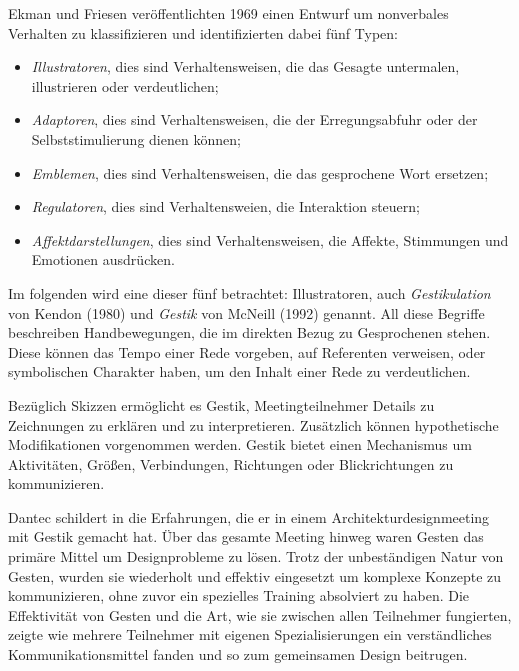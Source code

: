 Ekman und Friesen veröffentlichten 1969 einen Entwurf um nonverbales Verhalten zu klassifizieren und identifizierten dabei fünf Typen:
\begin{itemize}
	\item \emph{Illustratoren}, dies sind Verhaltensweisen, die das Gesagte untermalen, illustrieren oder verdeutlichen;
	\item \emph{Adaptoren}, dies sind Verhaltensweisen, die der Erregungsabfuhr oder der Selbststimulierung dienen können;
	\item \emph{Emblemen}, dies sind Verhaltensweisen, die das gesprochene Wort ersetzen;
	\item \emph{Regulatoren}, dies sind Verhaltensweien, die Interaktion steuern;
	\item \emph{Affektdarstellungen}, dies sind Verhaltensweisen, die Affekte, Stimmungen und Emotionen ausdrücken.
\end{itemize} \begin{flushright} \citep{Schaefer:2003} \end{flushright}

Im folgenden wird eine dieser fünf betrachtet: Illustratoren, auch \emph{Gestikulation} von Kendon (1980) und \emph{Gestik} von McNeill (1992) genannt. All diese Begriffe beschreiben Handbewegungen, die im direkten Bezug zu Gesprochenen stehen. Diese können das Tempo einer Rede vorgeben, auf Referenten verweisen, oder symbolischen Charakter haben, um den Inhalt einer Rede zu verdeutlichen. \citep{Goldin:2003}

\medskip Bezüglich Skizzen ermöglicht es Gestik, Meetingteilnehmer Details zu Zeichnungen zu erklären und zu interpretieren. Zusätzlich können hypothetische Modifikationen vorgenommen werden. Gestik bietet einen Mechanismus um Aktivitäten, Größen, Verbindungen, Richtungen oder Blickrichtungen zu kommunizieren. 

Dantec schildert in \citep{Dantec:2009} die Erfahrungen, die er in einem Architekturdesignmeeting mit Gestik gemacht hat.  Über das gesamte Meeting hinweg waren Gesten das primäre Mittel um Designprobleme zu lösen. Trotz der unbeständigen Natur von Gesten, wurden sie wiederholt und effektiv eingesetzt um komplexe Konzepte zu kommunizieren, ohne zuvor ein spezielles Training absolviert zu haben. Die Effektivität von Gesten und die Art, wie sie zwischen allen Teilnehmer fungierten, zeigte wie mehrere Teilnehmer mit eigenen Spezialisierungen ein verständliches Kommunikationsmittel fanden und so zum gemeinsamen Design beitrugen.

